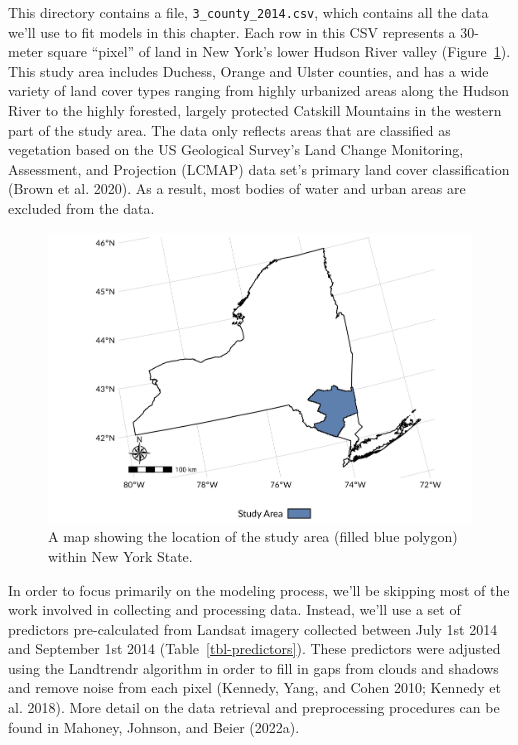 \documentclass[
  letterpaper,
  DIV=11,
  numbers=noendperiod]{scrartcl}
\begin{document}
This directory contains a file, \texttt{3\_county\_2014.csv}, which
contains all the data we'll use to fit models in this chapter. Each row
in this CSV represents a 30-meter square ``pixel'' of land in New York's
lower Hudson River valley (Figure~\ref{fig-inset}). This study area
includes Duchess, Orange and Ulster counties, and has a wide variety of
land cover types ranging from highly urbanized areas along the Hudson
River to the highly forested, largely protected Catskill Mountains in
the western part of the study area. The data only reflects areas that
are classified as vegetation based on the US Geological Survey's Land
Change Monitoring, Assessment, and Projection (LCMAP) data set's primary
land cover classification (Brown et al. 2020). As a result, most bodies
of water and urban areas are excluded from the data.

\begin{figure}

{\centering \includegraphics{figures/inset_map.png}

}

\caption{\label{fig-inset}A map showing the location of the study area
(filled blue polygon) within New York State.}

\end{figure}

In order to focus primarily on the modeling process, we'll be skipping
most of the work involved in collecting and processing data. Instead,
we'll use a set of predictors pre-calculated from Landsat imagery
collected between July 1st 2014 and September 1st 2014
(Table~\ref{tbl-predictors}). These predictors were adjusted using the
Landtrendr algorithm in order to fill in gaps from clouds and shadows
and remove noise from each pixel (Kennedy, Yang, and Cohen 2010; Kennedy
et al. 2018). More detail on the data retrieval and preprocessing
procedures can be found in Mahoney, Johnson, and Beier (2022a).
\end{document}
